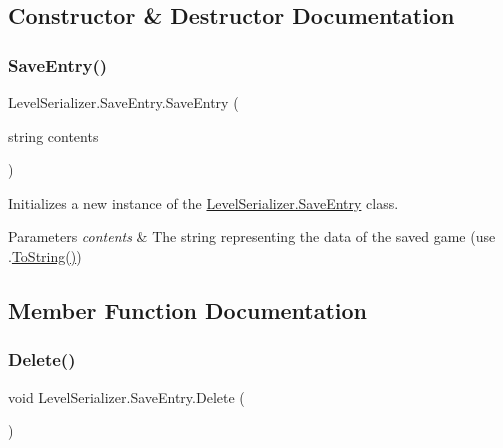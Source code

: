 \subsection{Constructor \& Destructor Documentation}
\mbox{\label{class_level_serializer_1_1_save_entry_a60b88cee5e6967c3b5b026ad78b4bc88}} 
\subsubsection{\texorpdfstring{Save\+Entry()}{SaveEntry()}}
{\footnotesize\ttfamily Level\+Serializer.\+Save\+Entry.\+Save\+Entry (\begin{DoxyParamCaption}\item[{string}]{contents }\end{DoxyParamCaption})\hspace{0.3cm}{\ttfamily [inline]}}



Initializes a new instance of the \hyperlink{class_level_serializer_1_1_save_entry}{Level\+Serializer.\+Save\+Entry} class. 


\begin{DoxyParams}{Parameters}
{\em contents} & The string representing the data of the saved game (use .\hyperlink{class_level_serializer_1_1_save_entry_a643faa4c478ba8fed108000aa3493157}{To\+String()}) \\
\hline
\end{DoxyParams}


\subsection{Member Function Documentation}
\mbox{\label{class_level_serializer_1_1_save_entry_a2765a55d5ea9a53a7f2abc9e0d4ea3c9}} 
\subsubsection{\texorpdfstring{Delete()}{Delete()}}
{\footnotesize\ttfamily void Level\+Serializer.\+Save\+Entry.\+Delete (\begin{DoxyParamCaption}{ }\end{DoxyParamCaption})\hspace{0.3cm}{\ttfamily [inline]}}



